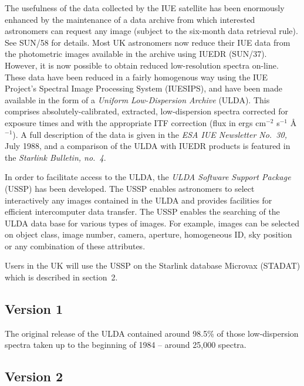 The usefulness of the data collected by the IUE satellite
has been enormously enhanced by the maintenance of a data archive
from which interested astronomers can request any image (subject 
to the six-month data retrieval rule). See SUN/58 for details.   
Most UK astronomers now reduce their IUE data from the photometric 
images available in the archive using IUEDR (SUN/37).   However, 
it is now possible to obtain reduced low-resolution spectra on-line.   
These data have been reduced in a fairly
homogenous way using the IUE Project's Spectral Image Processing System
(IUESIPS), 
and have been made available in the form of a {\it Uniform Low-Dispersion
Archive} (ULDA).  
This comprises absolutely-calibrated,  extracted, low-dispersion 
spectra corrected for exposure times and with the appropriate  ITF correction
(flux in ergs cm$^{-2}$  s$^{-1}$ {\AA}$^{-1}$).
A full description of the data is given in the {\it ESA IUE Newsletter No.~30,}
July 1988,
and a comparison of the ULDA with IUEDR products is featured in
the {\it Starlink Bulletin, no.~4}.

In order to facilitate access to the ULDA, the {\it ULDA Software Support 
Package} (USSP) has been developed. 
The USSP enables astronomers to select interactively 
any images contained in the ULDA and provides facilities for efficient
intercomputer data transfer.
The USSP enables the searching of the ULDA 
data base for various types of images.
For example, images can be selected on object class, image number, camera,
aperture,  homogeneous ID,
sky position or any combination of these attributes.

Users in the UK will use the USSP on the Starlink database
Microvax (STADAT) which is described in section~2. 

\subsection {Version 1}

The original release of the ULDA contained around 98.5\% of those
low-dispersion spectra taken up to the beginning of 1984 -- around
25,000 spectra.

\subsection {Version 2}


